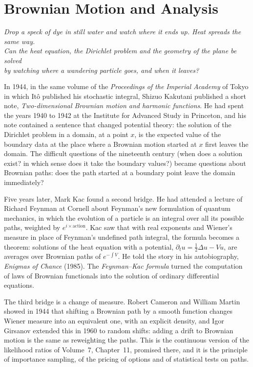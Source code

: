 \chapter{Brownian Motion and Analysis}

\begin{center}\itshape
Drop a speck of dye in still water and watch where it ends up. Heat spreads the same way.\\
Can the heat equation, the Dirichlet problem and the geometry of the plane be solved\\
by watching where a wandering particle goes, and when it leaves?
\end{center}

In 1944, in the same volume of the \emph{Proceedings of the Imperial Academy} of Tokyo in which It\^o published his stochastic integral, Shizuo Kakutani published a short note,
\emph{Two-dimensional Brownian motion and harmonic functions}. He had spent the years 1940 to 1942 at the Institute for Advanced Study in Princeton, and his note contained a sentence that
changed potential theory: the solution of the Dirichlet problem in a domain, at a point $x$, is the expected value of the boundary data at the place where a Brownian motion started at $x$ first
leaves the domain. The difficult questions of the nineteenth century (when does a solution exist? in which sense does it take the boundary values?) became questions about Brownian paths:
does the path started at a boundary point leave the domain immediately?

Five years later, Mark Kac found a second bridge. He had attended a lecture of Richard Feynman at Cornell about Feynman's new formulation of quantum mechanics, in which the evolution of a particle
is an integral over all its possible paths, weighted by $e^{i\times\text{action}}$. Kac saw that with real exponents and Wiener's measure in place of Feynman's undefined path integral, the formula
becomes a theorem: solutions of the heat equation with a potential, $\partial_tu=\frac12\Delta u-Vu$, are averages over Brownian paths of $e^{-\int V}$. He told the story in his autobiography,
\emph{Enigmas of Chance} (1985). The \emph{Feynman--Kac formula} turned the computation of laws of Brownian functionals into the solution of ordinary differential equations.

The third bridge is a change of measure. Robert Cameron and William Martin showed in 1944 that shifting a Brownian path by a smooth function changes Wiener measure into an equivalent one, with an
explicit density, and Igor Girsanov extended this in 1960 to random shifts: adding a drift to Brownian motion is the same as reweighting the paths. This is the continuous version of the likelihood
ratios of Volume~7, Chapter~11, promised there, and it is the principle of importance sampling, of the pricing of options and of statistical tests on paths.

